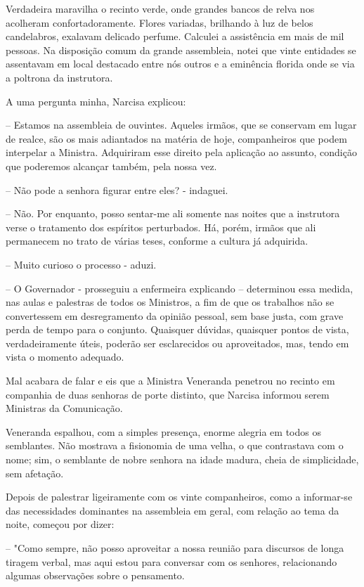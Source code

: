 \documentclass[portuguese,12pt,a4paper]{scrbook}
\begin{document}
	Verdadeira maravilha o recinto verde, onde grandes bancos de relva nos acolheram confortadoramente. Flores variadas, brilhando à luz de belos candelabros, exalavam delicado perfume. Calculei a assistência em mais de mil pessoas. Na disposição comum da grande assembleia, notei que vinte entidades se assentavam em local destacado entre nós outros e a eminência florida onde se via a poltrona da instrutora.
	
	A uma pergunta minha, Narcisa explicou:
	
	– Estamos na assembleia de ouvintes. Aqueles irmãos, que se conservam em lugar de realce, são os mais adiantados na matéria de hoje, companheiros que podem interpelar a Ministra. Adquiriram esse direito pela aplicação ao assunto, condição que poderemos alcançar também, pela nossa vez.
	
	– Não pode a senhora figurar entre eles? - indaguei.
	
	– Não. Por enquanto, posso sentar-me ali somente nas noites que a instrutora verse o tratamento dos espíritos perturbados. Há, porém, irmãos que ali permanecem no trato de várias teses, conforme a cultura já adquirida.
	
	
	– Muito curioso o processo - aduzi.
	
	– O Governador - prosseguiu a enfermeira explicando – determinou essa medida, nas aulas e palestras de todos os Ministros, a fim de que os trabalhos não se convertessem em desregramento da opinião pessoal, sem base justa, com grave perda de tempo para o conjunto. Quaisquer dúvidas, quaisquer pontos de vista, verdadeiramente úteis, poderão ser esclarecidos ou aproveitados, mas, tendo em vista o momento adequado.
	
	Mal acabara de falar e eis que a Ministra Veneranda penetrou no recinto em companhia de duas senhoras de porte distinto, que Narcisa informou serem Ministras da Comunicação.
	
	Veneranda espalhou, com a simples presença, enorme alegria em todos os semblantes. Não mostrava a fisionomia de uma velha, o que contrastava com o nome; sim, o semblante de nobre senhora na idade madura, cheia de simplicidade, sem afetação.
	
	Depois de palestrar ligeiramente com os vinte companheiros, como a informar-se das necessidades dominantes na assembleia em geral, com relação ao tema da noite, começou por dizer:
	
	– "Como sempre, não posso aproveitar a nossa reunião para discursos de longa tiragem verbal, mas aqui estou para conversar com os senhores, relacionando algumas observações sobre o pensamento.
	
\end{document}
